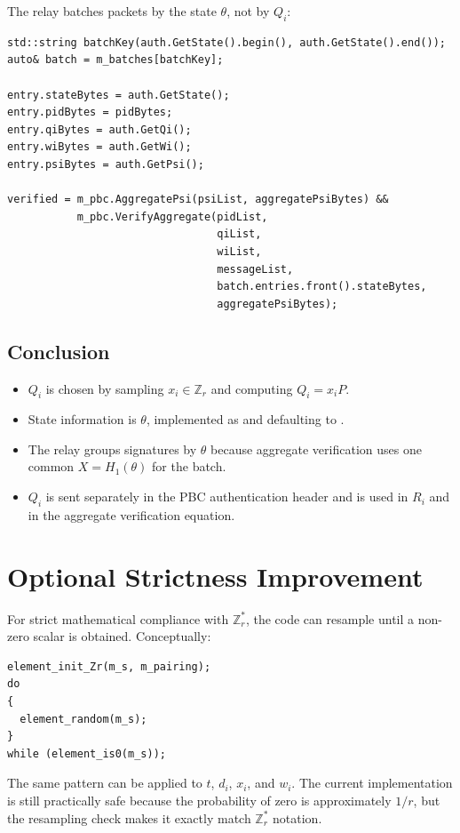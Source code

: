 \documentclass[11pt,a4paper]{article}
\newcommand{\codepath}[1]{\path{#1}}
\begin{document}
The relay batches packets by the state \(\theta\), not by \(Q_i\):

\begin{lstlisting}[style=cppstyle,caption={Relay batches by state theta and verifies with Qi.}]
std::string batchKey(auth.GetState().begin(), auth.GetState().end());
auto& batch = m_batches[batchKey];

entry.stateBytes = auth.GetState();
entry.pidBytes = pidBytes;
entry.qiBytes = auth.GetQi();
entry.wiBytes = auth.GetWi();
entry.psiBytes = auth.GetPsi();

verified = m_pbc.AggregatePsi(psiList, aggregatePsiBytes) &&
           m_pbc.VerifyAggregate(pidList,
                                 qiList,
                                 wiList,
                                 messageList,
                                 batch.entries.front().stateBytes,
                                 aggregatePsiBytes);
\end{lstlisting}

\subsection{Conclusion}

\begin{itemize}[leftmargin=*]
  \item \(Q_i\) is chosen by sampling \(x_i\in\mathbb{Z}_r\) and computing \(Q_i=x_iP\).
  \item State information is \(\theta\), implemented as \codepath{m_stateInfo} and defaulting to \codepath{traffic-alert}.
  \item The relay groups signatures by \(\theta\) because aggregate verification uses one common \(X=H_1(\theta)\) for the batch.
  \item \(Q_i\) is sent separately in the PBC authentication header and is used in \(R_i\) and in the aggregate verification equation.
\end{itemize}

\section{Optional Strictness Improvement}

For strict mathematical compliance with \(\mathbb{Z}_r^*\), the code can resample
until a non-zero scalar is obtained. Conceptually:

\begin{lstlisting}[style=cppstyle,caption={Optional strict non-zero scalar sampling pattern.}]
element_init_Zr(m_s, m_pairing);
do
{
  element_random(m_s);
}
while (element_is0(m_s));
\end{lstlisting}

The same pattern can be applied to \(t\), \(d_i\), \(x_i\), and \(w_i\). The
current implementation is still practically safe because the probability of
zero is approximately \(1/r\), but the resampling check makes it exactly match
\(\mathbb{Z}_r^*\) notation.
\end{document}
